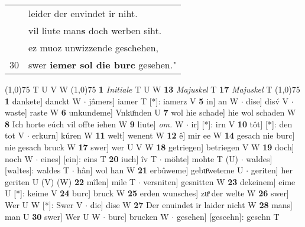 \documentclass[8pt,a4paper,notitlepage]{article}
\begin{document}
\begin{table}[ht]
\begin{minipage}[t]{0.5\linewidth}
\begin{tabular}{rl}
 & leider der envindet ir niht.\\ 
 & vil liute man\textbf{s} doch werben siht.\\ 
 & ez muoz unwizzende geschehen,\\ 
30 & swer \textbf{iemer sol die burc} gesehen."\\ 
\end{tabular}
\scriptsize
\line(1,0){75} \newline
T U V W \newline
\line(1,0){75} \newline
\textbf{1} \textit{Initiale} T U W  \textbf{13} \textit{Majuskel} T  \textbf{17} \textit{Majuskel} T  \newline
\line(1,0){75} \newline
\textbf{1} dankete] danckt W  $\cdot$ jâmers] iamer T [*]: iamerz V \textbf{5} in] an W  $\cdot$ dise] disv́ V  $\cdot$ waste] raste W \textbf{6} unkundeme] Vnkuͦnden U \textbf{7} wol hie schade] hie wol schaden W \textbf{8} Ich horte eúch vil offte iehen W \textbf{9} liute] \textit{om.} W  $\cdot$ ir] [*]: irn V \textbf{10} tôt] [*]: den tot V  $\cdot$ erkurn] kúren W \textbf{11} welt] wenent W \textbf{12} ê] mir ee W \textbf{14} gesach nie burc] nie gesach bruck W \textbf{17} swer] wer U V W \textbf{18} getriegen] betriegen V W \textbf{19} doch] noch W  $\cdot$ eines] [ein]: eins T \textbf{20} iuch] îv T  $\cdot$ möhte] mohte T (U)  $\cdot$ waldes] [waltes]: waldes T  $\cdot$ hân] wol han W \textbf{21} erbûweme] gebuͦweteme U  $\cdot$ geriten] her geriten U (V) (W) \textbf{22} mîlen] mile T  $\cdot$ versniten] gesnitten W \textbf{23} dekeinem] eime U [*]: keime V \textbf{24} burc] bruck W \textbf{25} erden wunsches] zuͦ der welte W \textbf{26} swer] Wer U W [*]: Swer V  $\cdot$ die] dise W \textbf{27} Der enuindet ir laider nicht W \textbf{28} mans] man U \textbf{30} swer] Wer U W  $\cdot$ burc] brucken W  $\cdot$ gesehen] [gescehn]: gesehn T \newline
\end{minipage}
\end{table}
\end{document}
